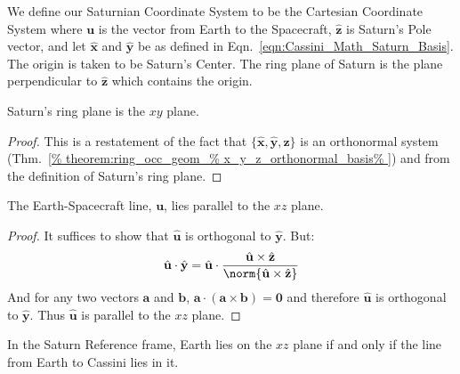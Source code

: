 \documentclass[crop=false,class=book,oneside]{standalone}
\begin{document}
        We define our Saturnian Coordinate System to be the
        Cartesian Coordinate System where $\mathbf{u}$
        is the vector from Earth to the Spacecraft,
        $\hat{\mathbf{z}}$ is Saturn's Pole vector, and let
        $\hat{\mathbf{x}}$ and $\hat{\mathbf{y}}$
        be as defined in
        Eqn.~\ref{eqn:Cassini_Math_Saturn_Basis}.
        The origin is taken to be Saturn's Center.
        The ring plane of Saturn is the plane perpendicular
        to $\hat{\mathbf{z}}$ which contains the origin.
        \begin{theorem}
            Saturn's ring plane is the $xy$ plane.
        \end{theorem}
        \begin{proof}
            This is a restatement of the fact that
            $\{\hat{\mathbf{x}},%
               \hat{\mathbf{y}},%
               \hat{\mathbf{z}}\}$
            is an orthonormal system
            (Thm.~\ref{%
                theorem:ring_occ_geom_%
                x_y_z_orthonormal_basis%
            })
            and from the definition of Saturn's ring plane.
        \end{proof}
        \begin{theorem}
            \label{thm:Cassini_Math_u_parallel_xy}
            The Earth-Spacecraft line, $\mathbf{u}$,
            lies parallel to the $xz$ plane.
        \end{theorem}
        \begin{proof}
            It suffices to show that $\hat{\mathbf{u}}$
            is orthogonal to $\hat{\mathbf{y}}$.
            But:
            \begin{equation}
                \hat{\mathbf{u}}\cdot\hat{\mathbf{y}}
                =\hat{\mathbf{u}}\cdot
                \frac{\hat{\mathbf{u}}\times \hat{\mathbf{z}}}
                     {\norm{\hat{\mathbf{u}}
                      \times \hat{\mathbf{z}}}}
            \end{equation}
            And for any two vectors
            $\mathbf{a}$ and $\mathbf{b}$,
            $\mathbf{a}\cdot(\mathbf{a}\times\mathbf{b})%
             =\mathbf{0}$
            and therefore $\hat{\mathbf{u}}$ is orthogonal
            to $\hat{\mathbf{y}}$. Thus
            $\hat{\mathbf{u}}$ is parallel to the $xz$ plane.
        \end{proof}
        \begin{theorem}
            \label{thm:Cassini_Math_Earth_Line_Parallel_xz}
            In the Saturn Reference frame,
            Earth lies on the $xz$ plane if and
            only if the line from
            Earth to Cassini lies in it.
        \end{theorem}
\end{document}
